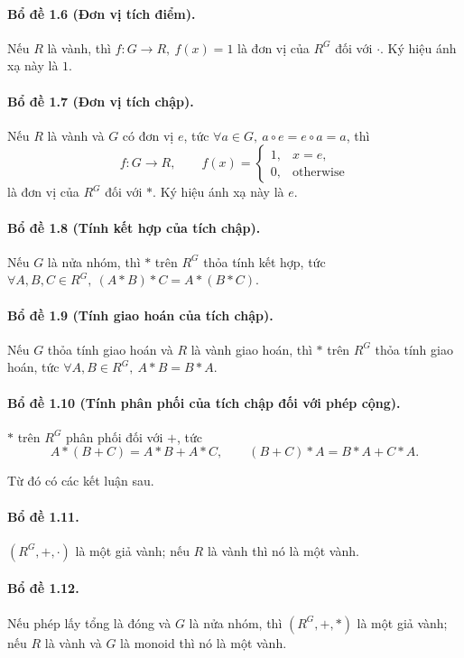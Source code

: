 \documentclass[11pt]{article}
\begin{document}
\paragraph{Bổ đề 1.6 (Đơn vị tích điểm).}
Nếu \(R\) là vành, thì \(f:G\to R,\ f(x)=1\) là đơn vị của \(R^G\) đối với
\(\cdot\). Ký hiệu ánh xạ này là \(1\).

\paragraph{Bổ đề 1.7 (Đơn vị tích chập).}
Nếu \(R\) là vành và \(G\) có đơn vị \(e\), tức
\(\forall a\in G,\ a\circ e=e\circ a=a\), thì
\[
  f:G\to R,\qquad
  f(x)=
  \begin{cases}
    1, & x=e,\\
    0, & \text{otherwise}
  \end{cases}
\]
là đơn vị của \(R^G\) đối với \(*\). Ký hiệu ánh xạ này là \(e\).

\paragraph{Bổ đề 1.8 (Tính kết hợp của tích chập).}
Nếu \(G\) là nửa nhóm, thì \(*\) trên \(R^G\) thỏa tính kết hợp, tức
\(\forall A,B,C\in R^G,\ (A*B)*C=A*(B*C)\).

\paragraph{Bổ đề 1.9 (Tính giao hoán của tích chập).}
Nếu \(G\) thỏa tính giao hoán và \(R\) là vành giao hoán, thì \(*\) trên
\(R^G\) thỏa tính giao hoán, tức \(\forall A,B\in R^G,\ A*B=B*A\).

\paragraph{Bổ đề 1.10 (Tính phân phối của tích chập đối với phép cộng).}
\(*\) trên \(R^G\) phân phối đối với \(+\), tức
\[
  A*(B+C)=A*B+A*C,\qquad
  (B+C)*A=B*A+C*A.
\]

Từ đó có các kết luận sau.

\paragraph{Bổ đề 1.11.}
\((R^G,+,\cdot)\) là một giả vành; nếu \(R\) là vành thì nó là một vành.

\paragraph{Bổ đề 1.12.}
Nếu phép lấy tổng là đóng và \(G\) là nửa nhóm, thì \((R^G,+,*)\) là một giả
vành; nếu \(R\) là vành và \(G\) là monoid thì nó là một vành.
\end{document}
